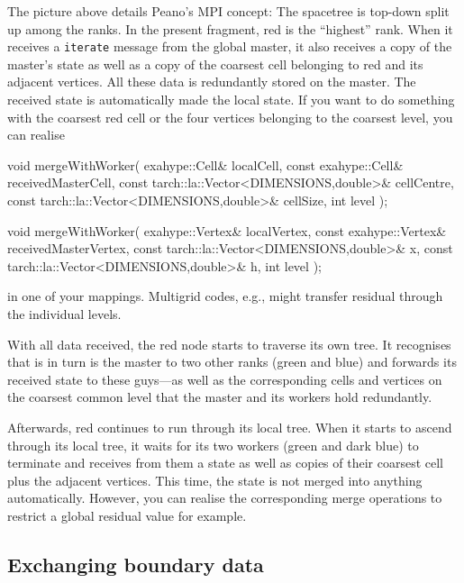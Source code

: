\noindent
The picture above details Peano's MPI concept:
The spacetree is top-down split up among the ranks. 
In the present fragment, red is the ``highest'' rank.
When it receives a \texttt{iterate} message from the global master, it also
receives a copy of the master's state as well as a copy of the coarsest cell
belonging to red and its adjacent vertices.
All these data is redundantly stored on the master.
The received state is automatically made the local state.
If you want to do something with the coarsest red cell or the four vertices
belonging to the coarsest level, you can realise 
\begin{code}
void mergeWithWorker(
  exahype::Cell&                               localCell, 
  const exahype::Cell&                         receivedMasterCell,
  const tarch::la::Vector<DIMENSIONS,double>&  cellCentre,
  const tarch::la::Vector<DIMENSIONS,double>&  cellSize,
  int                                          level
);

void mergeWithWorker(
  exahype::Vertex&                             localVertex,
  const exahype::Vertex&                       receivedMasterVertex,
  const tarch::la::Vector<DIMENSIONS,double>&  x,
  const tarch::la::Vector<DIMENSIONS,double>&  h,
  int                                          level
);
\end{code}

\noindent
in one of your mappings. Multigrid codes, e.g., might transfer residual through
the individual levels.

With all data received, the red node starts to traverse its own tree. 
It recognises that is in turn is the master to two other ranks (green and blue)
and forwards its received state to these guys---as well as the corresponding
cells and vertices on the coarsest common level that the master and its workers
hold redundantly.

Afterwards, red continues to run through its local tree. 
When it starts to ascend through its local tree, it waits for its two workers
(green and dark blue) to terminate and receives from them a state as well as
copies of their coarsest cell plus the adjacent vertices.
This time, the state is not merged into anything automatically. 
However, you can realise the corresponding merge operations to restrict a global
residual value for example.


\subsection{Exchanging boundary data}

